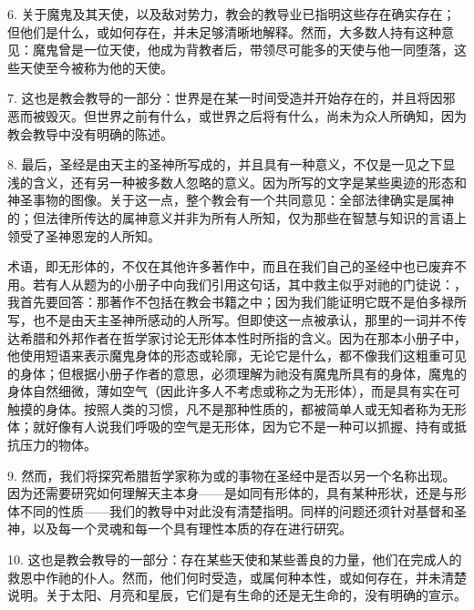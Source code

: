 6. 关于魔鬼及其天使，以及敌对势力，教会的教导业已指明这些存在确实存在；但他们是什么，或如何存在，并未足够清晰地解释。然而，大多数人持有这种意见：魔鬼曾是一位天使，他成为背教者后，带领尽可能多的天使与他一同堕落，这些天使至今被称为他的天使。\par

7. 这也是教会教导的一部分：世界是在某一时间受造并开始存在的，并且将因邪恶而被毁灭。但世界之前有什么，或世界之后将有什么，尚未为众人所确知，因为教会教导中没有明确的陈述。\par

8. 最后，圣经是由天主的圣神所写成的，并且具有一种意义，不仅是一见之下显浅的含义，还有另一种被多数人忽略的意义。因为所写的文字是某些奥迹的形态和神圣事物的图像。关于这一点，整个教会有一个共同意见：全部法律确实是属神的；但法律所传达的属神意义并非为所有人所知，仅为那些在智慧与知识的言语上领受了圣神恩宠的人所知。\par

术语，即无形体的，不仅在其他许多著作中，而且在我们自己的圣经中也已废弃不用。若有人从题为的小册子中向我们引用这句话，其中救主似乎对祂的门徒说：，我首先要回答：那著作不包括在教会书籍之中；因为我们能证明它既不是伯多禄所写，也不是由天主圣神所感动的人所写。但即使这一点被承认，那里的一词并不传达希腊和外邦作者在哲学家讨论无形体本性时所指的含义。因为在那本小册子中，他使用短语来表示魔鬼身体的形态或轮廓，无论它是什么，都不像我们这粗重可见的身体；但根据小册子作者的意思，必须理解为祂没有魔鬼所具有的身体，魔鬼的身体自然细微，薄如空气（因此许多人不考虑或称之为无形体），而是具有实在可触摸的身体。按照人类的习惯，凡不是那种性质的，都被简单人或无知者称为无形体；就好像有人说我们呼吸的空气是无形体，因为它不是一种可以抓握、持有或抵抗压力的物体。\par

9. 然而，我们将探究希腊哲学家称为或的事物在圣经中是否以另一个名称出现。因为还需要研究如何理解天主本身——是如同有形体的，具有某种形状，还是与形体不同的性质——我们的教导中对此没有清楚指明。同样的问题还须针对基督和圣神，以及每一个灵魂和每一个具有理性本质的存在进行研究。\par

10. 这也是教会教导的一部分：存在某些天使和某些善良的力量，他们在完成人的救恩中作祂的仆人。然而，他们何时受造，或属何种本性，或如何存在，并未清楚说明。关于太阳、月亮和星辰，它们是有生命的还是无生命的，没有明确的宣示。\par

